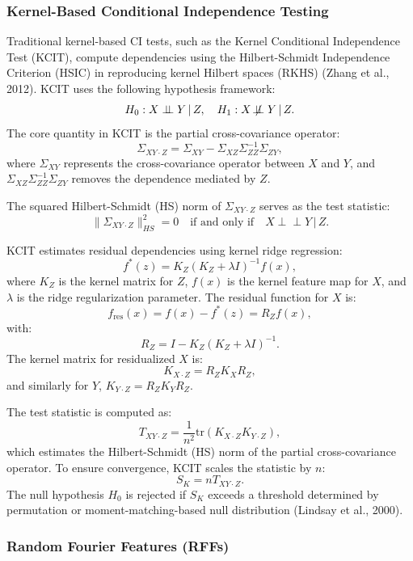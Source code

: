 \documentclass[
]{article}
\begin{document}
\subsubsection{Kernel-Based Conditional Independence
Testing}\label{kernel-based-conditional-independence-testing}

Traditional kernel-based CI tests, such as the Kernel Conditional
Independence Test (KCIT), compute dependencies using the Hilbert-Schmidt
Independence Criterion (HSIC) in reproducing kernel Hilbert spaces
(RKHS) (Zhang et al., 2012). KCIT uses the following hypothesis
framework: \[
H_0: X \perp\!\!\!\perp Y \,|\, Z, \quad H_1: X \not\!\perp\!\!\!\perp Y \,|\, Z.
\] The core quantity in KCIT is the partial cross-covariance operator:
\[
\Sigma_{XY \cdot Z} = \Sigma_{XY} - \Sigma_{XZ} \Sigma_{ZZ}^{-1} \Sigma_{ZY},
\] where \(\Sigma_{XY}\) represents the cross-covariance operator
between \(X\) and \(Y\), and
\(\Sigma_{XZ} \Sigma_{ZZ}^{-1} \Sigma_{ZY}\) removes the dependence
mediated by \(Z\).

The squared Hilbert-Schmidt (HS) norm of \(\Sigma_{XY \cdot Z}\) serves
as the test statistic: \[
\|\Sigma_{XY \cdot Z}\|^2_{HS} = 0 \quad \text{if and only if} \quad X \perp\!\!\!\perp Y \,|\, Z.
\]

KCIT estimates residual dependencies using kernel ridge regression: \[
f^*(z) = K_Z (K_Z + \lambda I)^{-1} f(x),
\] where \(K_Z\) is the kernel matrix for \(Z\), \(f(x)\) is the kernel
feature map for \(X\), and \(\lambda\) is the ridge regularization
parameter. The residual function for \(X\) is: \[
f_\text{res}(x) = f(x) - f^*(z) = R_Z f(x),
\] with: \[
R_Z = I - K_Z (K_Z + \lambda I)^{-1}.
\] The kernel matrix for residualized \(X\) is: \[
K_{X \cdot Z} = R_Z K_X R_Z,
\] and similarly for \(Y\), \(K_{Y \cdot Z} = R_Z K_Y R_Z\).

The test statistic is computed as: \[
T_{XY \cdot Z} = \frac{1}{n^2} \text{tr}(K_{X \cdot Z} K_{Y \cdot Z}),
\] which estimates the Hilbert-Schmidt (HS) norm of the partial
cross-covariance operator. To ensure convergence, KCIT scales the
statistic by \(n\): \[
S_K = n T_{XY \cdot Z}.
\] The null hypothesis \(H_0\) is rejected if \(S_K\) exceeds a
threshold determined by permutation or moment-matching-based null
distribution (Lindsay et al., 2000).

\subsubsection{Random Fourier Features
(RFFs)}\label{random-fourier-features-rffs}
\end{document}
